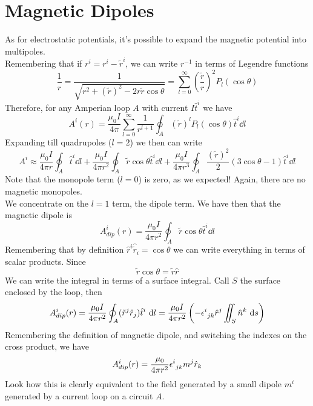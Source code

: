 \documentclass[../electromagnetism]{subfiles}
\begin{document}
\section{Magnetic Dipoles}
As for electrostatic potentials, it's possible to expand the magnetic potential into multipoles.\\
Remembering that if $r^i=r^i-\tilde{r}^i$, we can write $r^{-1}$ in terms of Legendre functions
\begin{equation*}
	\frac{1}{r}=\frac{1}{\sqrt{r^2+(\tilde{r})^2-2r\tilde{r}\cos\theta}}=\sum_{l=0}^\infty\left( \frac{\tilde{r}}{r} \right)^2P_l(\cos\theta)
\end{equation*}
Therefore, for any Amperian loop $A$ with current $I\hat{t}^i$ we have
\begin{equation}
	A^i(r)=\frac{\mu_0I}{4\pi}\sum_{l=0}^\infty\frac{1}{r^{l+1}}\oint_A\left( \tilde{r} \right)^lP_l(\cos\theta)\hat{t}^i\dd l
	\label{eq:exactexpansion}
\end{equation}
Expanding till quadrupoles ($l=2$) we then can write
\begin{equation}
	A^i\approx\frac{\mu_0 I}{4\pi r}\oint_A\hat{t}^i\dd l+\frac{\mu_0I}{4\pi r^2}\oint_A\tilde{r}\cos\theta\hat{t}^i\dd l+\frac{\mu_0I}{4\pi r^3}\oint_A\frac{(\tilde{r})^2}{2}\left( 3\cos\theta-1 \right)\hat{t}^i\dd l
	\label{eq:aquadrupoleb}
\end{equation}
Note that the monopole term ($l=0$) is zero, as we expected! Again, there are no magnetic monopoles.\\
We concentrate on the $l=1$ term, the dipole term. We have then that the magnetic dipole is
\begin{equation}
	A_{dip}^i(r)=\frac{\mu_0I}{4\pi r^2}\oint_A\tilde{r}\cos\theta\hat{t}^i\dd l
	\label{eq:magdipint}
\end{equation}
Remembering that by definition $\hat{r}^i\hat{\tilde{r}}_i=\cos\theta$ we can write everything in terms of scalar products. Since
\begin{equation*}
	\tilde{r}\cos\theta=\tilde{r}\hat{r}
\end{equation*}
We can write the integral in terms of a surface integral. Call $S$ the surface enclosed by the loop, then
\begin{equation*}
	A_{dip}^i(r)=\frac{\mu_0I}{4\pi r^2}\oint_A(\tilde{r}^j\hat{r}_j)\hat{t}^i\ \mathrm{d} l=\frac{\mu_0I}{4\pi r^2}\left( -\epsilon^{i}_{\ jk}\hat{r}^j\iint_S\hat{n}^k\ \mathrm{d} s \right)
\end{equation*}
Remembering the definition of magnetic dipole, and switching the indexes on the cross product, we have
\begin{equation}
	A_{dip}^i(r)=\frac{\mu_0}{4\pi r^2}\epsilon^{i}_{\ jk}m^j\hat{r}_k
	\label{eq:dipolepotmag}
\end{equation}
Look how this is clearly equivalent to the field generated by a small dipole $m^i$ generated by a current loop on a circuit $A$.\\
\end{document}

